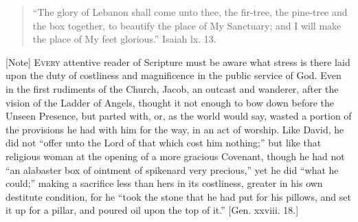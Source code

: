 
\begin{quote}

``The glory of Lebanon shall come unto thee, the fir-tree,
the pine-tree and the box together, to beautify the place of My
Sanctuary; and I will make the place of My feet glorious.''
Isaiah lx. 13.

\end{quote}

[Note] E\textsc{very} attentive reader of
Scripture must be aware what stress is there laid upon the duty of
costliness and magnificence in the public service of God. Even in the
first rudiments of the Church, Jacob, an outcast and wanderer, after
the vision of the Ladder of Angels, thought it not enough to bow down
before the Unseen Presence, but parted with, or, as the world would
say, wasted a portion of the provisions he had with him for the way,
in an act of worship. Like David, he did not ``offer unto the Lord
of that which cost him nothing;'' but like that religious woman at
the opening of a more gracious Covenant, though he had not ``an
alabaster box of ointment of spikenard very precious,'' yet he did
``what he could;'' making a sacrifice less than hers in its
costliness, greater in his own destitute condition, for he ``took
the stone that he had put for his pillows, and set it up for a pillar,
and poured oil upon the top of it.'' [Gen. xxviii. 18.]

